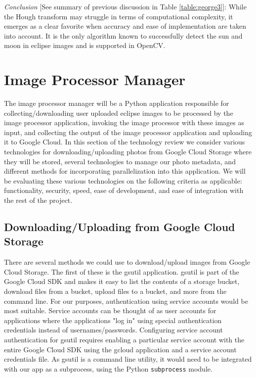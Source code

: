 \documentclass[10pt, onecolumn, draftclsnofoot, letterpaper, compsoc]{IEEEtran}
\begin{document}
\textit{Conclusion} [See summary of previous discussion in Table
\ref{table:george3}]: While the Hough transform may struggle in terms of computational
complexity, it emerges as a clear favorite when accuracy and ease of
implementation are taken into account. It is the only algorithm known to
successfully detect the sun and moon in eclipse images and is supported in
OpenCV.

\section{Image Processor Manager}

The image processor manager will be a Python application responsible for  
collecting/downloading user uploaded eclipse images to be processed by the image
processor application, invoking the image processor with these images as input,
and collecting the output of the image processor application and uploading it
to Google Cloud. In this section of the technology review we consider various
technologies for downloading/uploading photos from Google Cloud Storage where
they will be stored, several technologies to manage our photo metadata, and
different methods for incorporating parallelization into this application. We will
be evaluating these various technologies on the following criteria as applicable:
functionality, security, speed, ease of development, and ease of integration with
the rest of the project. \\

\subsection{Downloading/Uploading from Google Cloud Storage}

There are several methods we could use to download/upload images from Google Cloud
Storage. The first of these is the gsutil application. gsutil is part of the Google
Cloud SDK and makes it easy to list the contents of a storage bucket, download files
from a bucket, upload files to a bucket, and more from the command 
line\cite{gsutil, cloudStorage}. For our purposes, authentication using
service accounts would be most suitable. Service accounts can be
thought of as user accounts for applications where the applications "log in"
using special authentication credentials instead of usernames/passwords. Configuring
service account authentication for gsutil requires enabling a particular service
account with the entire Google Cloud SDK using the gcloud application and a service
account credentials file. As gsutil is a command line utility, it would need to be
integrated with our app as a subprocess, using the Python {\tt subprocess} module. \\
\end{document}
